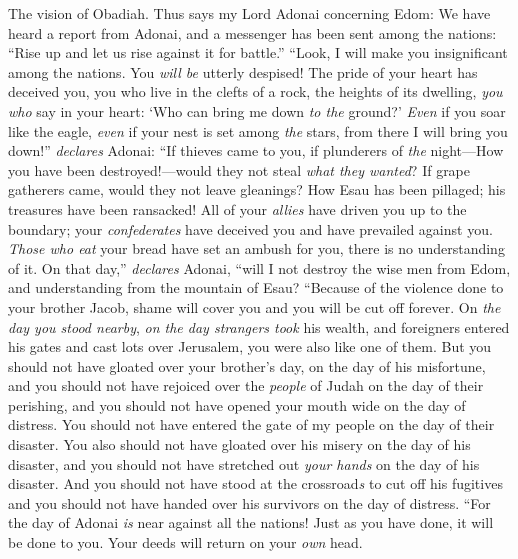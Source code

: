 
\begin{biblechapter} %
 The vision of Obadiah. Thus says my Lord Adonai concerning Edom:
 We have heard a report from Adonai, and a messenger has been sent among the nations: “Rise up and let us rise against it for battle.”
\verse “Look, I will make you insignificant among the nations. You \textit{will be} utterly despised!
\verse The pride of your heart has deceived you, you who live in the clefts of a rock, the heights of its dwelling, \textit{you who} say in your heart: ‘Who can bring me down \textit{to the} ground?’
\verse \textit{Even} if you soar like the eagle, \textit{even} if your nest is set among \textit{the} stars, from there I will bring you down!” \textit{declares} Adonai:
\verse “If thieves came to you, if plunderers of \textit{the} night—How you have been destroyed!—would they not steal \textit{what they wanted}? If grape gatherers came, would they not leave gleanings?
\verse How Esau has been pillaged; his treasures have been ransacked!
\verse All of your \textit{allies} have driven you up to the boundary; your \textit{confederates} have deceived you and have prevailed against you. \textit{Those who eat} your bread have set an ambush for you, there is no understanding of it.
\verse On that day,” \textit{declares} Adonai, “will I not destroy the wise men from Edom, and understanding from the mountain of Esau?
 “Because of the violence done to your brother Jacob, shame will cover you and you will be cut off forever.
\verse On \textit{the day you stood nearby}, \textit{on the day strangers took} his wealth, and foreigners entered his gates and cast lots over Jerusalem, you were also like one of them.
\verse But you should not have gloated over your brother’s day, on the day of his misfortune, and you should not have rejoiced over the \textit{people} of Judah on the day of their perishing, and you should not have opened your mouth wide on the day of distress.
\verse You should not have entered the gate of my people on the day of their disaster. You also should not have gloated over his misery on the day of his disaster, and you should not have stretched out \textit{your hands} on the day of his disaster.
\verse And you should not have stood at the crossroad\textit{s} to cut off his fugitives and you should not have handed over his survivors on the day of distress.
 “For the day of Adonai \textit{is} near against all the nations! Just as you have done, it will be done to you. Your deeds will return on your \textit{own} head.

\end{biblechapter}
